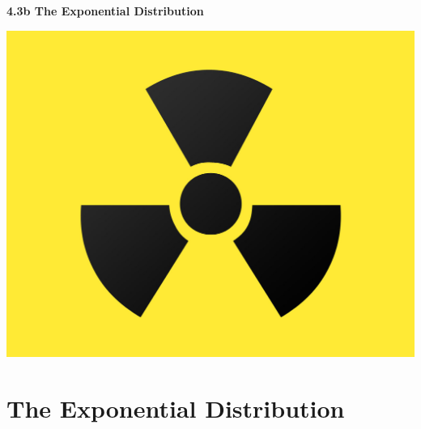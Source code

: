 \section{}

\begin{frame}
  
  \begin{center}
    \Large{\textbf{4.3b The Exponential Distribution}}
  \end{center}
  
  \bigskip
  
  \begin{center}
    \includegraphics[height=.5\textheight]{figure/radioactive}
  \end{center}
\end{frame}

\section{The Exponential Distribution}

